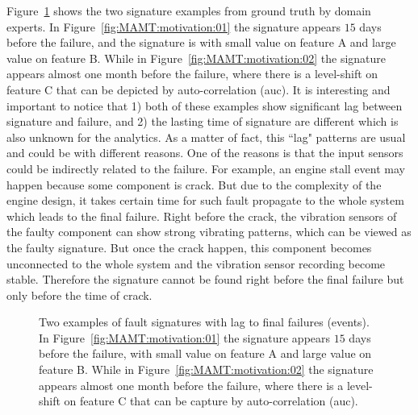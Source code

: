 Figure~\ref{fig:MAMT:motivation} shows the two signature examples from ground truth by domain experts. In Figure~\ref{fig:MAMT:motivation:01} the signature appears $15$ days before the failure, and the signature is with small value on feature A and large value on feature B. While in Figure~\ref{fig:MAMT:motivation:02} the signature appears almost one month before the failure, where there is a level-shift on feature C that can be depicted by auto-correlation (auc). It is interesting and important to notice that 1) both of these examples show significant lag between signature and failure, and 2) the lasting time of signature are different which is also unknown for the analytics. As a matter of fact, this ``lag" patterns are usual and could be with different reasons. One of the reasons is that the input sensors could be indirectly related to the failure. For example, an engine stall event may happen because some component is crack. But due to the complexity of the engine design, it takes certain time for such fault propagate to the whole system which leads to the final failure. Right before the crack, the vibration sensors of the faulty component can show strong vibrating patterns, which can be viewed as the faulty signature. But once the crack happen, this component becomes unconnected to the whole system and the vibration sensor recording become stable. Therefore the signature cannot be found right before the final failure but only before the time of crack.  

\begin{figure}[htb]
\centering
{}
\caption{Two examples of fault signatures with lag to final failures (events). In Figure~\ref{fig:MAMT:motivation:01} the signature appears $15$ days before the failure, with small value on feature A and large value on feature B. While in Figure~\ref{fig:MAMT:motivation:02} the signature appears almost one month before the failure, where there is a level-shift on feature C that can be capture by auto-correlation (auc).}
\label{fig:MAMT:motivation}
\end{figure}

